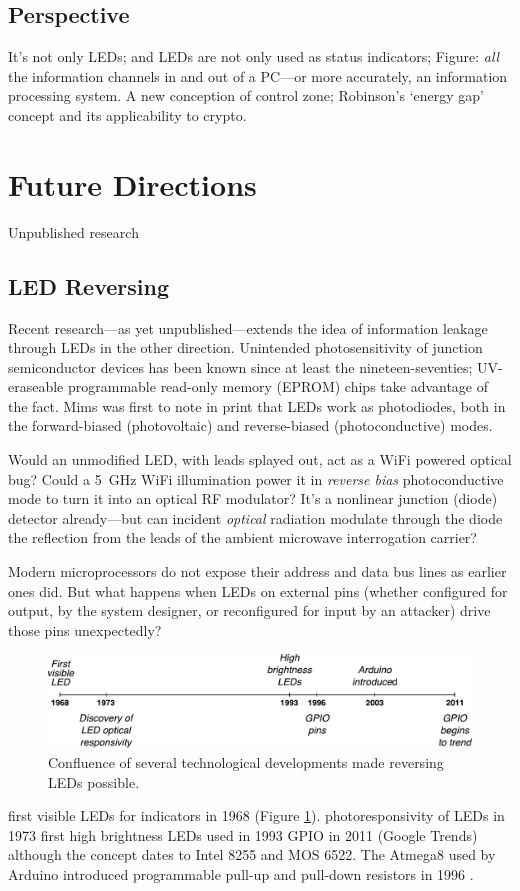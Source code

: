 \documentclass[a4paper,twoside,oldfontcommands]{memoir}
\begin{document}
\subsection{Perspective}
It's not only LEDs; and LEDs are not only used as status indicators; Figure:
\emph{all} the information channels in and out of a PC---or more accurately,
an information processing system. A new conception of control zone;
Robinson's `energy gap' concept and its applicability to crypto.
\section{Future Directions}
Unpublished research
\subsection{LED Reversing}
Recent research---as yet unpublished---extends the idea of information leakage
through LEDs in the other direction. Unintended photosensitivity of junction
semiconductor devices has been known since at least the nineteen-seventies;
UV-eraseable programmable read-only memory (EPROM) chips take advantage of the
fact. Mims \citeyear{Mims1973b} was first to note in print that LEDs work as
photodiodes, both in the forward-biased (photovoltaic) and reverse-biased
(photoconductive) modes.

Would an unmodified LED, with leads splayed out, act as a WiFi powered
optical bug? Could a \SI{5}{\giga\hertz} WiFi illumination power it in
\emph{reverse bias} photoconductive mode to turn it into an optical RF
modulator? It's a nonlinear junction (diode) detector already---but can
incident \emph{optical} radiation modulate through the diode the reflection
from the leads of the ambient microwave interrogation carrier?

Modern microprocessors do not expose their address and data bus lines as
earlier ones did. But what happens when LEDs on external pins (whether
configured for output, by the system designer, or reconfigured for input by an
attacker) drive those pins unexpectedly?
\begin{figure}[ht]
  \centering
  \includegraphics[width=\textwidth]{timeline.pdf}
  \caption{Confluence of several technological developments made reversing LEDs
    possible.}
  \label{figure:timeline}
\end{figure}
first visible LEDs for indicators in 1968 (Figure \ref{figure:timeline}).
photoresponsivity of LEDs in 1973
first high brightness LEDs used in 1993
GPIO in 2011 (Google Trends) although the concept dates to Intel 8255 and MOS
6522. The Atmega8 used by Arduino introduced programmable pull-up and pull-down
resistors in 1996 \cite{Mims1973b,Atmel2013,Stringfellow1997}.
\end{document}
